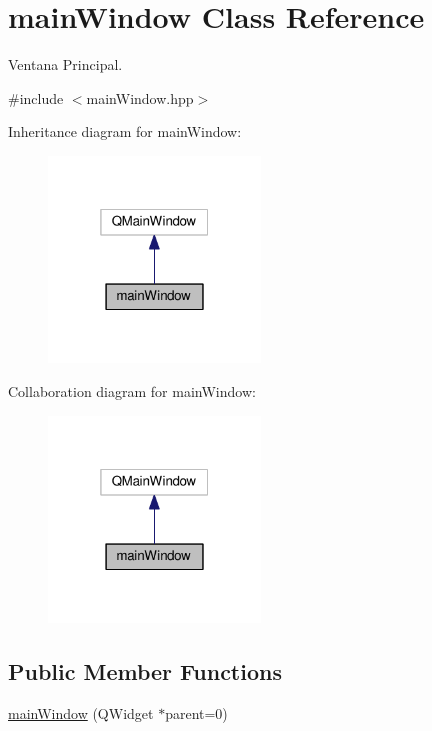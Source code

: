 \hypertarget{classmainWindow}{}\section{main\+Window Class Reference}
\label{classmainWindow}


Ventana Principal.  




{\ttfamily \#include $<$main\+Window.\+hpp$>$}



Inheritance diagram for main\+Window\+:
\nopagebreak
\begin{figure}[H]
\begin{center}
\leavevmode
\includegraphics[width=160pt]{classmainWindow__inherit__graph}
\end{center}
\end{figure}


Collaboration diagram for main\+Window\+:
\nopagebreak
\begin{figure}[H]
\begin{center}
\leavevmode
\includegraphics[width=160pt]{classmainWindow__coll__graph}
\end{center}
\end{figure}
\subsection*{Public Member Functions}
\begin{DoxyCompactItemize}
\item 
\hyperlink{classmainWindow_a2c09a8baf94af0cc5109fcf2ef97b12a}{main\+Window} (Q\+Widget $\ast$parent=0)
\end{DoxyCompactItemize}



